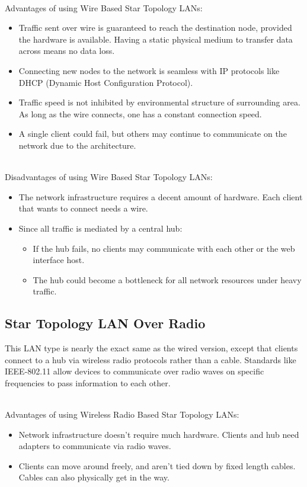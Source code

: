 \documentclass[onecolumn, draftclsnofoot,10pt, compsoc]{IEEEtran}
\begin{document}
		\noindent \\Advantages of using Wire Based Star Topology LANs:
		\begin{itemize}
			\item Traffic sent over wire is guaranteed to reach the destination node, provided the hardware is available.  Having a static physical medium to transfer data across means no data loss.
			\item Connecting new nodes to the network is seamless with IP protocols like DHCP (Dynamic Host Configuration Protocol).
			\item Traffic speed is not inhibited by environmental structure of surrounding area.  As long as the wire connects, one has a constant connection speed.
			\item A single client could fail, but others may continue to communicate on the network due to the architecture.
		\end{itemize}

		\noindent \\Disadvantages of using Wire Based Star Topology LANs:
		\begin{itemize}
			\item The network infrastructure requires a decent amount of hardware.  Each client that wants to connect needs a wire.
			\item Since all traffic is mediated by a central hub:
			\begin{itemize}
				\item If the hub fails, no clients may communicate with each other or the web interface host.
				\item The hub could become a bottleneck for all network resources under heavy traffic.
			\end{itemize}
		\end{itemize}

		\subsection{Star Topology LAN Over Radio}
		This LAN type is nearly the exact same as the wired version, except that clients connect to a hub via wireless radio protocols rather than a cable.
		Standards like IEEE-802.11 allow devices to communicate over radio waves on specific frequencies to pass information to each other. \cite{LAN3}

		\noindent \\Advantages of using Wireless Radio Based Star Topology LANs:
		\begin{itemize}
			\item Network infrastructure doesn't require much hardware.  Clients and hub need adapters to communicate via radio waves.
			\item Clients can move around freely, and aren't tied down by fixed length cables.  Cables can also physically get in the way.
		\end{itemize}
\end{document}
